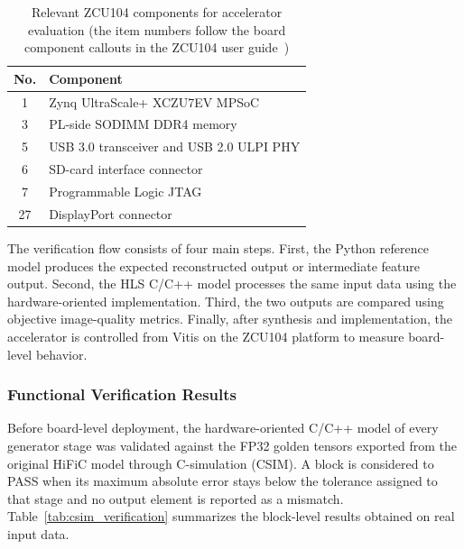 \begin{table}[H]
    \centering
    \caption[Relevant ZCU104 components for accelerator evaluation]{Relevant ZCU104 components for accelerator evaluation (the item numbers follow the board component callouts in the ZCU104 user guide~\cite{xilinx2018zcu104})}
    \label{tab:zcu104_components}
    \begin{tabular}{|c|l|}
        \hline
        \textbf{No.} & \textbf{Component} \\
        \hline
        1 & Zynq UltraScale+ XCZU7EV MPSoC \\
        \hline
        3 & PL-side SODIMM DDR4 memory \\
        \hline
        5 & USB 3.0 transceiver and USB 2.0 ULPI PHY \\
        \hline
        6 & SD-card interface connector \\
        \hline
        7 & Programmable Logic JTAG \\
        \hline
        27 & DisplayPort connector \\
        \hline
    \end{tabular}
\end{table}

The verification flow consists of four main steps. First, the Python reference model produces the expected reconstructed output or intermediate feature output. Second, the HLS C/C++ model processes the same input data using the hardware-oriented implementation. Third, the two outputs are compared using objective image-quality metrics. Finally, after synthesis and implementation, the accelerator is controlled from Vitis on the ZCU104 platform to measure board-level behavior.

\subsubsection{Functional Verification Results}

Before board-level deployment, the hardware-oriented C/C++ model of every generator stage was validated against the FP32 golden tensors exported from the original HiFiC model through C-simulation (CSIM). A block is considered to PASS when its maximum absolute error stays below the tolerance assigned to that stage and no output element is reported as a mismatch. Table~\ref{tab:csim_verification} summarizes the block-level results obtained on real input data.

